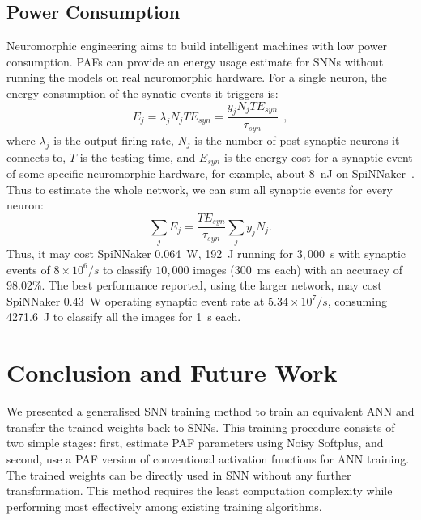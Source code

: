 \documentclass{article}
\begin{document}
\subsection{Power Consumption}
Neuromorphic engineering aims to build intelligent machines with low power consumption.
PAFs can provide an energy usage estimate for SNNs without running the models on real neuromorphic hardware.
For a single neuron, the energy consumption of the synatic events it triggers is:
\begin{equation}
E_{j} = \lambda_j N_j T E_{syn} = \dfrac{y_j N_j T E_{syn}}{\tau_{syn}}~~,
\label{equ:energy}
\end{equation}
where $\lambda_j$ is the output firing rate, $N_j$ is the number of post-synaptic neurons it connects to, $T$ is the testing time, and $E_{syn}$ is the energy cost for a synaptic event of some specific neuromorphic hardware, for example, about 8~nJ on SpiNNaker~\cite{stromatias2013power}.
Thus to estimate the whole network, we can sum all synaptic events for every neuron:
\begin{equation}
\sum_j E_{j} =  \dfrac{T E_{syn}}{\tau_{syn}} \sum_{j}y_j N_j.
\end{equation}
Thus, it may cost SpiNNaker 0.064~W, 192~J running for $3,000$~s with synaptic events of $8\times10^6/s$ to classify $10,000$ images (300~ms each) with an accuracy of 98.02\%.
The best performance reported, using the larger network, may cost SpiNNaker 0.43~W operating synaptic event rate at $5.34\times10^7/s$, consuming 4271.6~J to classify all the images for 1~s each.

\section{Conclusion and Future Work}
We presented a generalised SNN training method to train an equivalent ANN and transfer the trained weights back to SNNs.
This training procedure consists of two simple stages: first, estimate PAF parameters using Noisy Softplus, and second, use a PAF version of conventional activation functions for ANN training. %
The trained weights can be directly used in SNN without any further transformation.
This method requires the least computation complexity while performing most effectively among existing training algorithms.
\end{document}
